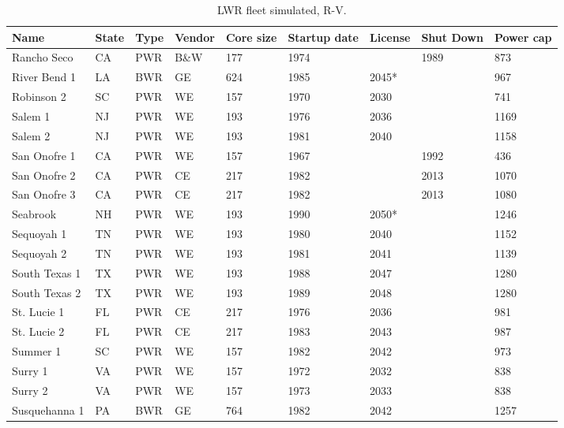 \begin{table}[H]
    \centering
    \caption{LWR fleet simulated, R-V.}
    \label{tab:lwr_fleet4}
    \begin{tabular}{l l l l l l l l l}
    \hline
    \textbf{Name} & \textbf{State} & \textbf{Type} & \textbf{Vendor} & \textbf{Core size} & \textbf{Startup date} & \textbf{License} & \textbf{Shut Down} & \textbf{Power cap} \\
    \hline
    Rancho Seco         & CA & PWR & B\&W & 177 & 1974 &      & 1989 & 873 \\
    River Bend 1        & LA & BWR & GE   & 624 & 1985 & 2045*&      & 967 \\
    Robinson 2          & SC & PWR & WE   & 157 & 1970 & 2030 &      & 741 \\
    Salem 1             & NJ & PWR & WE   & 193 & 1976 & 2036 &      & 1169\\
    Salem 2             & NJ & PWR & WE   & 193 & 1981 & 2040 &      & 1158\\
    San Onofre 1        & CA & PWR & WE   & 157 & 1967 &      & 1992 & 436 \\
    San Onofre 2        & CA & PWR & CE   & 217 & 1982 &      & 2013 & 1070\\
    San Onofre 3        & CA & PWR & CE   & 217 & 1982 &      & 2013 & 1080\\
    Seabrook            & NH & PWR & WE   & 193 & 1990 & 2050*&      & 1246\\
    Sequoyah 1          & TN & PWR & WE   & 193 & 1980 & 2040 &      & 1152\\
    Sequoyah 2          & TN & PWR & WE   & 193 & 1981 & 2041 &      & 1139\\
    South Texas 1       & TX & PWR & WE   & 193 & 1988 & 2047 &      & 1280\\
    South Texas 2       & TX & PWR & WE   & 193 & 1989 & 2048 &      & 1280\\
    St. Lucie 1         & FL & PWR & CE   & 217 & 1976 & 2036 &      & 981 \\
    St. Lucie 2         & FL & PWR & CE   & 217 & 1983 & 2043 &      & 987 \\
    Summer 1            & SC & PWR & WE   & 157 & 1982 & 2042 &      & 973 \\
    Surry 1             & VA & PWR & WE   & 157 & 1972 & 2032 &      & 838 \\
    Surry 2             & VA & PWR & WE   & 157 & 1973 & 2033 &      & 838 \\
    Susquehanna 1       & PA & BWR & GE   & 764 & 1982 & 2042 &      & 1257 \\

\end{tabular}
\end{table}
